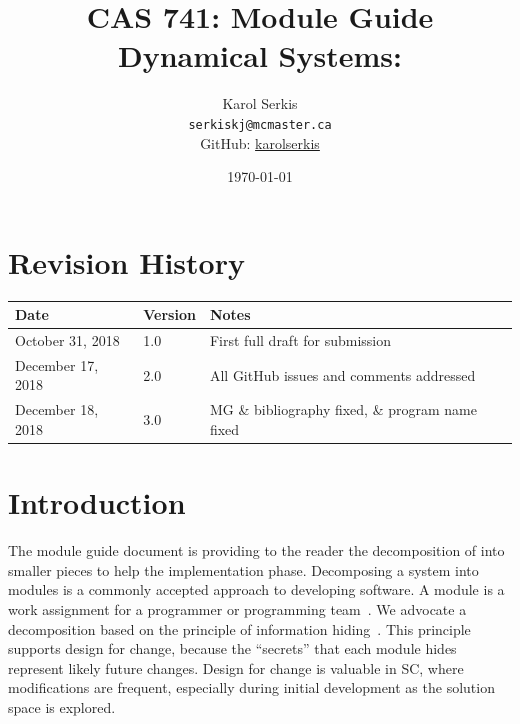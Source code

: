 \documentclass[12pt, titlepage]{article}
\begin{document}
\title{CAS 741: Module Guide\\[10pt]\Large Dynamical Systems: \progname}
\author{Karol Serkis\\\texttt{serkiskj@mcmaster.ca}\\GitHub:
\href{https://www.github.com/karolserkis}{karolserkis}}
\date{\today}

\maketitle


\section{Revision History}

\begin{tabularx}{\textwidth}{p{4cm}p{2cm}X}
\toprule {\bf Date} & {\bf Version} & {\bf Notes}\\
\midrule
October 31, 2018 & 1.0 &  First full draft for submission\\
December 17, 2018 & 2.0 & All GitHub issues and comments addressed \\
December 18, 2018 & 3.0 & MG \& bibliography fixed, 
\& program name fixed \\
\bottomrule
\end{tabularx}

\newpage

\tableofcontents

\listoftables

\listoffigures

\newpage


\section{Introduction}

The module guide document is providing to the reader the decomposition of 
\progname into smaller pieces to help the implementation phase.
Decomposing a system into modules is a commonly accepted approach to developing
software.  A module is a work assignment for a programmer or programming
team~\citep{ParnasEtAl1984}.  We advocate a decomposition
based on the principle of information hiding~\citep{Parnas1972a}.  This
principle supports design for change, because the ``secrets'' that each module
hides represent likely future changes.  Design for change is valuable in SC,
where modifications are frequent, especially during initial development as the
solution space is explored.  
\end{document}

